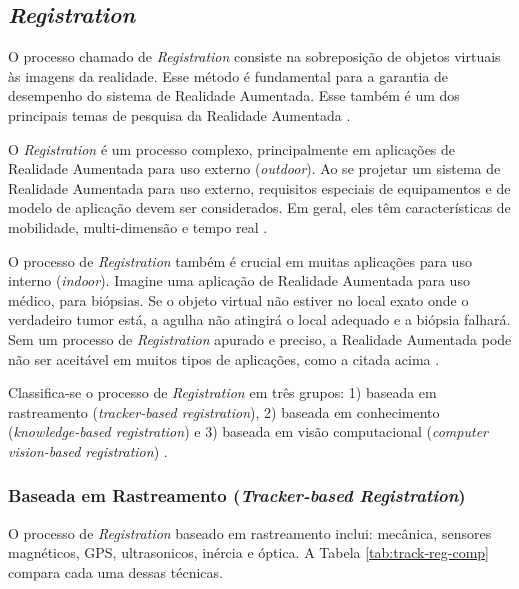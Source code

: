 \subsection{\textit{Registration}}

O processo chamado de \textit{Registration} consiste na sobreposição de objetos
virtuais às imagens da realidade. Esse método é fundamental para a garantia
de desempenho do sistema de Realidade Aumentada. Esse também é um dos principais
temas de pesquisa da Realidade Aumentada \cite{DevActuallyRegistration}.

O \textit{Registration} é um processo complexo, principalmente em aplicações de
Realidade Aumentada para uso externo (\textit{outdoor}). Ao se projetar um
sistema de Realidade Aumentada para uso externo, requisitos especiais de
equipamentos e de modelo de aplicação devem ser considerados. Em geral, eles
têm características de mobilidade, multi-dimensão e tempo real \cite{DevActuallyRegistration}.


O processo de \textit{Registration} também é crucial em muitas aplicações para uso interno
(\textit{indoor}). Imagine uma aplicação de Realidade Aumentada para uso médico, para biópsias.
Se o objeto virtual não estiver no local exato onde o verdadeiro tumor está, a agulha não atingirá
o local adequado e a biópsia falhará. Sem um processo de \textit{Registration} apurado e preciso, 
a Realidade Aumentada pode não ser aceitável em muitos tipos de aplicações, como a citada acima 
\cite{SurveyAR}.






Classifica-se o processo de \textit{Registration} em três grupos: 1) baseada em
rastreamento (\textit{tracker-based registration}), 2) baseada em conhecimento
(\textit{knowledge-based registration}) e 3) baseada em visão computacional
(\textit{computer vision-based registration}) \cite{DevActuallyRegistration}.



\subsubsection{Baseada em Rastreamento (\textit{Tracker-based Registration})}


O processo de \textit{Registration} baseado em rastreamento inclui: mecânica,
sensores magnéticos, GPS, ultrasonicos, inércia e óptica. A Tabela \ref{tab:track-reg-comp}
compara cada uma dessas técnicas.

